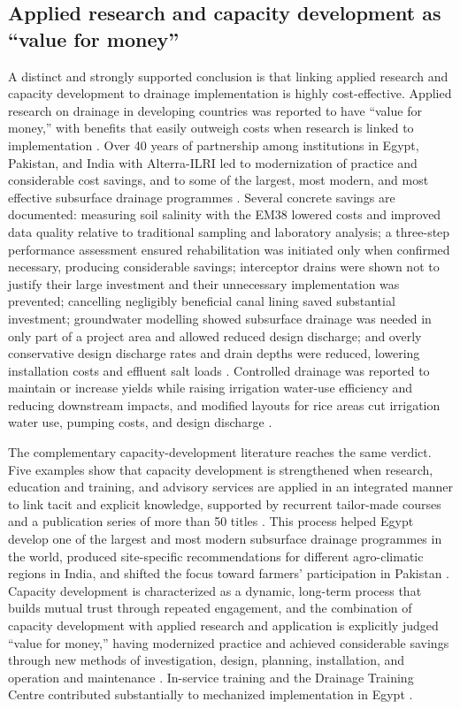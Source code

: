 \subsection{Applied research and capacity development as ``value for money''}
A distinct and strongly supported conclusion is that linking applied research and capacity development to drainage implementation is highly cost-effective. Applied research on drainage in developing countries was reported to have ``value for money,'' with benefits that easily outweigh costs when research is linked to implementation \parencite{Ritzema2007}. Over 40 years of partnership among institutions in Egypt, Pakistan, and India with Alterra-ILRI led to modernization of practice and considerable cost savings, and to some of the largest, most modern, and most effective subsurface drainage programmes \parencite{Ritzema2007}. Several concrete savings are documented: measuring soil salinity with the EM38 lowered costs and improved data quality relative to traditional sampling and laboratory analysis; a three-step performance assessment ensured rehabilitation was initiated only when confirmed necessary, producing considerable savings; interceptor drains were shown not to justify their large investment and their unnecessary implementation was prevented; cancelling negligibly beneficial canal lining saved substantial investment; groundwater modelling showed subsurface drainage was needed in only part of a project area and allowed reduced design discharge; and overly conservative design discharge rates and drain depths were reduced, lowering installation costs and effluent salt loads \parencite{Ritzema2007}. Controlled drainage was reported to maintain or increase yields while raising irrigation water-use efficiency and reducing downstream impacts, and modified layouts for rice areas cut irrigation water use, pumping costs, and design discharge \parencite{Ritzema2007}.

The complementary capacity-development literature reaches the same verdict. Five examples show that capacity development is strengthened when research, education and training, and advisory services are applied in an integrated manner to link tacit and explicit knowledge, supported by recurrent tailor-made courses and a publication series of more than 50 titles \parencite{Ritzema2008}. This process helped Egypt develop one of the largest and most modern subsurface drainage programmes in the world, produced site-specific recommendations for different agro-climatic regions in India, and shifted the focus toward farmers' participation in Pakistan \parencite{Ritzema2008,Ritzema2006}. Capacity development is characterized as a dynamic, long-term process that builds mutual trust through repeated engagement, and the combination of capacity development with applied research and application is explicitly judged ``value for money,'' having modernized practice and achieved considerable savings through new methods of investigation, design, planning, installation, and operation and maintenance \parencite{Ritzema2008}. In-service training and the Drainage Training Centre contributed substantially to mechanized implementation in Egypt \parencite{Ritzema2006}.

